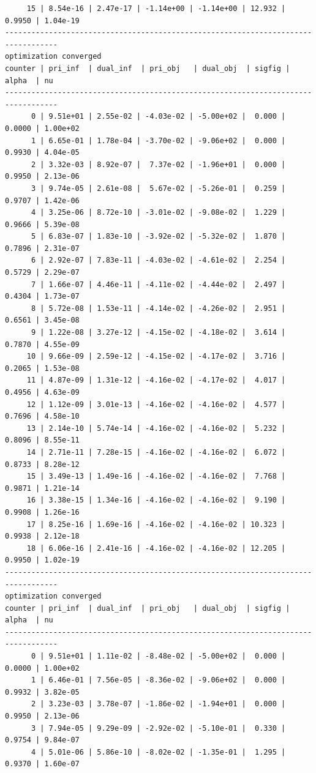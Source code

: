 \documentclass[
]{book}
\begin{document}
\begin{verbatim}
     15 | 8.54e-16 | 2.47e-17 | -1.14e+00 | -1.14e+00 | 12.932 | 0.9950 | 1.04e-19
----------------------------------------------------------------------------------
optimization converged
counter | pri_inf  | dual_inf  | pri_obj   | dual_obj  | sigfig | alpha  | nu 
----------------------------------------------------------------------------------
      0 | 9.51e+01 | 2.55e-02 | -4.03e-02 | -5.00e+02 |  0.000 | 0.0000 | 1.00e+02
      1 | 6.65e-01 | 1.78e-04 | -3.70e-02 | -9.06e+02 |  0.000 | 0.9930 | 4.04e-05
      2 | 3.32e-03 | 8.92e-07 |  7.37e-02 | -1.96e+01 |  0.000 | 0.9950 | 2.13e-06
      3 | 9.74e-05 | 2.61e-08 |  5.67e-02 | -5.26e-01 |  0.259 | 0.9707 | 1.42e-06
      4 | 3.25e-06 | 8.72e-10 | -3.01e-02 | -9.08e-02 |  1.229 | 0.9666 | 5.39e-08
      5 | 6.83e-07 | 1.83e-10 | -3.92e-02 | -5.32e-02 |  1.870 | 0.7896 | 2.31e-07
      6 | 2.92e-07 | 7.83e-11 | -4.03e-02 | -4.61e-02 |  2.254 | 0.5729 | 2.29e-07
      7 | 1.66e-07 | 4.46e-11 | -4.11e-02 | -4.44e-02 |  2.497 | 0.4304 | 1.73e-07
      8 | 5.72e-08 | 1.53e-11 | -4.14e-02 | -4.26e-02 |  2.951 | 0.6561 | 3.45e-08
      9 | 1.22e-08 | 3.27e-12 | -4.15e-02 | -4.18e-02 |  3.614 | 0.7870 | 4.55e-09
     10 | 9.66e-09 | 2.59e-12 | -4.15e-02 | -4.17e-02 |  3.716 | 0.2065 | 1.53e-08
     11 | 4.87e-09 | 1.31e-12 | -4.16e-02 | -4.17e-02 |  4.017 | 0.4956 | 4.63e-09
     12 | 1.12e-09 | 3.01e-13 | -4.16e-02 | -4.16e-02 |  4.577 | 0.7696 | 4.58e-10
     13 | 2.14e-10 | 5.74e-14 | -4.16e-02 | -4.16e-02 |  5.232 | 0.8096 | 8.55e-11
     14 | 2.71e-11 | 7.28e-15 | -4.16e-02 | -4.16e-02 |  6.072 | 0.8733 | 8.28e-12
     15 | 3.49e-13 | 1.49e-16 | -4.16e-02 | -4.16e-02 |  7.768 | 0.9871 | 1.21e-14
     16 | 3.38e-15 | 1.34e-16 | -4.16e-02 | -4.16e-02 |  9.190 | 0.9908 | 1.26e-16
     17 | 8.25e-16 | 1.69e-16 | -4.16e-02 | -4.16e-02 | 10.323 | 0.9938 | 2.12e-18
     18 | 6.06e-16 | 2.41e-16 | -4.16e-02 | -4.16e-02 | 12.205 | 0.9950 | 1.02e-19
----------------------------------------------------------------------------------
optimization converged
counter | pri_inf  | dual_inf  | pri_obj   | dual_obj  | sigfig | alpha  | nu 
----------------------------------------------------------------------------------
      0 | 9.51e+01 | 1.11e-02 | -8.48e-02 | -5.00e+02 |  0.000 | 0.0000 | 1.00e+02
      1 | 6.46e-01 | 7.56e-05 | -8.36e-02 | -9.06e+02 |  0.000 | 0.9932 | 3.82e-05
      2 | 3.23e-03 | 3.78e-07 | -1.86e-02 | -1.94e+01 |  0.000 | 0.9950 | 2.13e-06
      3 | 7.94e-05 | 9.29e-09 | -2.92e-02 | -5.10e-01 |  0.330 | 0.9754 | 9.84e-07
      4 | 5.01e-06 | 5.86e-10 | -8.02e-02 | -1.35e-01 |  1.295 | 0.9370 | 1.60e-07

\end{verbatim}
\end{document}

